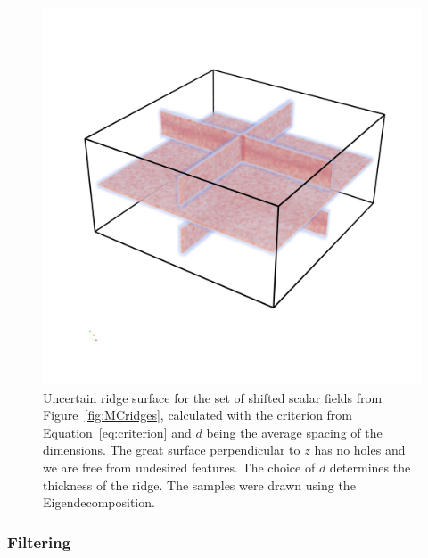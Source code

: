 \begin{figure}
    \centering
    \includegraphics[width=\textwidth]{Images/lowuncnew.png}
    \caption{Uncertain ridge surface for the set of shifted scalar
    fields from Figure~\ref{fig:MCridges}, calculated with the criterion
    from Equation~\ref{eq:criterion} and $d$ being the average spacing
    of the dimensions. The great surface perpendicular to $z$ has no
    holes and we are free from undesired features. The choice of $d$
    determines the thickness of the ridge. The samples were drawn using
    the Eigendecomposition.}
    \label{fig:newmethod}
\end{figure}

\subsubsection{Filtering}

